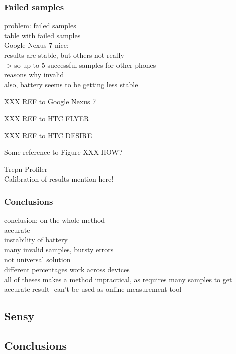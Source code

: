 \subsubsection{Failed samples}
problem: failed samples\\
	table with failed samples\\
	Google Nexus 7 nice:\\
		results are stable, but others not really\\
			-> so up to 5 successful samples for other phones\\
	reasons why invalid\\
	
	also, battery seems to be getting less stable
	
	XXX REF to Google Nexus 7
	

	XXX REF to HTC FLYER

	XXX REF to HTC DESIRE



Some reference to Figure XXX HOW?





	Trepn Profiler\\
	
	
	
	Calibration of results mention here!\\
   		
   
\subsubsection{Conclusions}   
conclusion: on the whole method\\
	accurate\\
	instability of battery\\
		many invalid samples, bursty errors\\
	not universal solution\\
		different percentages work across devices\\
	all of theses makes a method impractical, as requires many samples to get accurate result
		-can't be used as online measurement tool\\

\subsection{Sensy}
\subsection{Conclusions}